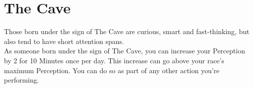 \section{The Cave}\label{zodiac:cave}

Those born under the sign of The Cave are curious, smart and fast-thinking, but also tend to have short attention spans.\\
As someone born under the sign of The Cave, you can increase your Perception by 2 for 10 Minutes once per day.
This increase can go above your race's maximum Perception.
You can do so as part of any other action you're performing.\\